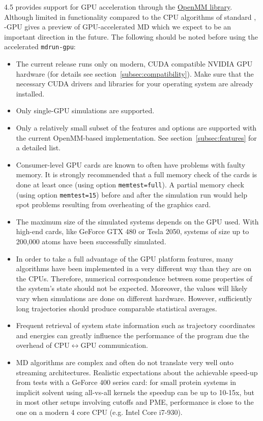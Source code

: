 {\gromacs} 4.5 provides support for GPU acceleration through 
the \href{https://simtk.org/home/openmm}{OpenMM library}. 
Although limited in functionality compared to the CPU algorithms of standard {\gromacs},
{\gromacs}-GPU gives a preview of GPU-accelerated MD which we expect to be an important direction in the future. 
The following should be noted before using the accelerated {\tt mdrun-gpu}:
\begin{itemize}
\item The current release runs only on modern, CUDA compatible NVIDIA GPU hardware 
(for details see section~\ref{subsec:compatibility}). Make sure that the necessary CUDA drivers and 
libraries for your operating system are already installed. 
\item Only single-GPU simulations are supported.
\item Only a relatively small subset of the {\gromacs} features and options are supported 
with the  current OpenMM-based implementation. See section~\ref{subsec:features} for 
a detailed list.
\item Consumer-level GPU cards are known to often have problems with faulty memory.
It is strongly recommended that a full memory check of the cards is done at least once
(using option {\tt memtest=full}). A partial memory check (using option {\tt memtest=15}) 
before and after the simulation run would help spot problems resulting from overheating 
of the graphics card.
\item The maximum size of the simulated systems depends on the GPU used. With
high-end cards, like GeForce GTX 480 or Tesla 2050, systems of size up to 200,000 atoms 
have been successfully simulated.
\item In order to take a full advantage of the GPU platform features, many algorithms
have been implemented in a very different way than they are on the CPUs.
Therefore, numerical correspondence between some properties of the system's state
should not be expected. Moreover, the values will likely vary when simulations are
done on different hardware. However, sufficiently long trajectories
should produce comparable statistical averages.
\item Frequent retrieval of system state information such as
trajectory coordinates and energies can greatly influence the performance
of the program due the overhead of CPU$\leftrightarrow$GPU communication.
\item MD algorithms are complex and often do not translate very well onto streaming architectures.
Realistic expectations about the achievable speed-up from tests with a GeForce 400 series card:
for small protein systems in implicit solvent using all-vs-all kernels the speedup 
can be up to 10-15x, but in most other setups involving cutoffs and PME, 
performance is close to the one on a modern 4 core CPU (e.g. Intel Core i7-930).
\end{itemize}

